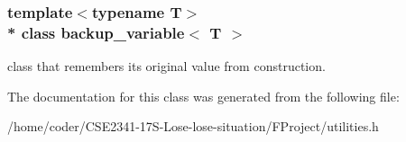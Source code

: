 \subsubsection*{template$<$typename T$>$\\*
class backup\+\_\+variable$<$ T $>$}

class that remembers its original value from construction. 

The documentation for this class was generated from the following file\+:\begin{DoxyCompactItemize}
\item 
/home/coder/\+C\+S\+E2341-\/17\+S-\/\+Lose-\/lose-\/situation/\+F\+Project/utilities.\+h\end{DoxyCompactItemize}
